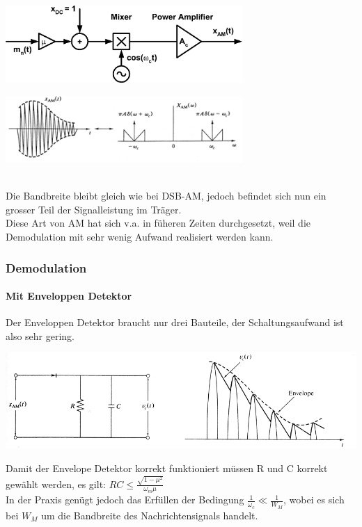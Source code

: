 \begin{minipage}[]{9cm}
	\includegraphics[width=9cm]{bilder/am_oam_modulation.png}
\end{minipage}
\begin{minipage}[]{9cm}
    \includegraphics[width=9cm]{bilder/am_oam_spektrum.png}
\end{minipage}\\
Die Bandbreite bleibt gleich wie bei DSB-AM, jedoch befindet sich nun ein grosser Teil der
Signalleistung im Träger. \\
Diese Art von AM hat sich v.a. in füheren Zeiten durchgesetzt, weil die Demodulation mit sehr
wenig Aufwand realisiert werden kann. 

\subsubsection{Demodulation}
\paragraph{Mit Enveloppen Detektor}
Der Enveloppen Detektor braucht nur drei Bauteile, der Schaltungsaufwand ist also
sehr gering.\\
\begin{center}	
      \includegraphics[width=14cm]{bilder/am_oam_enveloppeDetektor.png}
\end{center}
Damit der Envelope Detektor korrekt funktioniert müssen R und C korrekt gewählt werden, es gilt:
$RC \leq \frac{\sqrt{1 - \mu^2}}{\omega_m \mu}$ \\
In der Praxis genügt jedoch das Erfüllen der Bedingung $\frac{1}{\omega_c} \ll \frac{1}{W_M}$,
wobei es sich bei $W_M$ um die Bandbreite des Nachrichtensignals handelt. 

